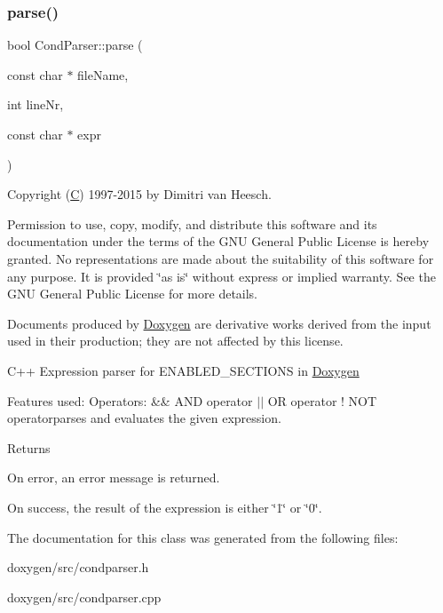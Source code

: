 \subsubsection{\texorpdfstring{parse()}{parse()}}
{\footnotesize\ttfamily bool Cond\+Parser\+::parse (\begin{DoxyParamCaption}\item[{const char $\ast$}]{file\+Name,  }\item[{int}]{line\+Nr,  }\item[{const char $\ast$}]{expr }\end{DoxyParamCaption})}

Copyright (\mbox{\hyperlink{class_c}{C}}) 1997-\/2015 by Dimitri van Heesch.

Permission to use, copy, modify, and distribute this software and its documentation under the terms of the G\+NU General Public License is hereby granted. No representations are made about the suitability of this software for any purpose. It is provided \char`\"{}as is\char`\"{} without express or implied warranty. See the G\+NU General Public License for more details.

Documents produced by \mbox{\hyperlink{class_doxygen}{Doxygen}} are derivative works derived from the input used in their production; they are not affected by this license.

C++ Expression parser for E\+N\+A\+B\+L\+E\+D\+\_\+\+S\+E\+C\+T\+I\+O\+NS in \mbox{\hyperlink{class_doxygen}{Doxygen}}

Features used\+: Operators\+: \&\& A\+ND operator $\vert$$\vert$ OR operator ! N\+OT operatorparses and evaluates the given expression. \begin{DoxyReturn}{Returns}

\begin{DoxyItemize}
\item On error, an error message is returned.
\item On success, the result of the expression is either \char`\"{}1\char`\"{} or \char`\"{}0\char`\"{}. 
\end{DoxyItemize}
\end{DoxyReturn}


The documentation for this class was generated from the following files\+:\begin{DoxyCompactItemize}
\item 
doxygen/src/condparser.\+h\item 
doxygen/src/condparser.\+cpp\end{DoxyCompactItemize}
